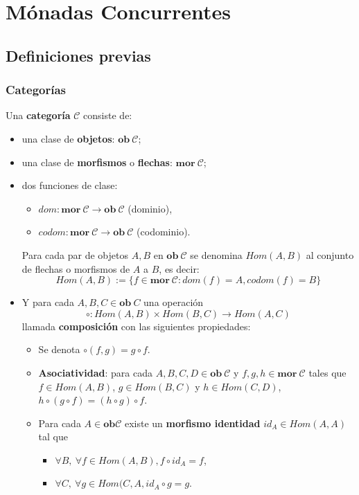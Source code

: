 \chapter{M\'onadas Concurrentes}\label{chapter:monconc}


\section{Definiciones previas}\label{monconc:previas}

\subsection{Categorías}\label{previas:cat}
Una \textbf{categoría} $\mathscr{C}$ consiste de:
\vspace{-0.75\baselineskip}
\begin{itemize}[noitemsep,label=$\blacktriangleright$]
	\item una clase de \textbf{objetos}: $\mathbf{ob} \ \mathscr{C}$;
	\item una clase de \textbf{morfismos} o \textbf{flechas}: $\mathbf{mor} \ \mathscr{C}$;
	\item dos funciones de clase:
	\begin{itemize}[noitemsep,label=$\bullet$]
		\item $dom : \mathbf{mor} \ \mathscr{C} \rightarrow \mathbf{ob} \ \mathscr{C}$ (dominio),
		\item $codom : \mathbf{mor} \ \mathscr{C} \rightarrow \mathbf{ob} \ \mathscr{C}$ (codominio).
	\end{itemize}
	Para cada par de objetos $A, B$ en $\mathbf{ob} \ \mathscr{C}$ se denomina $Hom(A,B)$ al conjunto de flechas o morfismos de $A$ a $B$, es decir:
	\begin{equation*}
		Hom(A,B) := \{f \in \mathbf{mor} \ \mathscr{C} : dom(f) = A, codom(f) = B\}
	\end{equation*}
	\item Y para cada $A, B, C \in \mathbf{ob} \ \mathit{C}$ una operación  
	\begin{equation*}
		\circ : Hom(A,B) \times Hom(B,C) \rightarrow Hom(A,C)
	\end{equation*}
	llamada \textbf{composición} con las siguientes propiedades: 
	\begin{itemize}[noitemsep,label=$\bullet$]
		\item Se denota $\circ(f,g) = g \circ f$.
		\item \textbf{Asociatividad}: para cada $A,B,C,D \in \mathbf{ob} \ \mathscr{C}$ y $f,g,h \in \mathbf{mor} \ \mathscr{C}$ tales que $f \in Hom(A,B)$, $g \in Hom(B,C)$ y $h \in Hom(C,D)$, \ \ $h \circ (g \circ f) = (h \circ g) \circ f$.
		\item Para cada $A \in \mathbf{ob} \mathscr{C}$ existe un \textbf{morfismo identidad} $id_A \in Hom(A,A)$ tal que
		\begin{itemize}[noitemsep,label=$\star$]
			\item $\forall B, \ \forall f \in Hom(A,B), f \circ id_A = f$,
			\item $\forall C, \ \forall g \in Hom(C,A, id_A \circ g = g$.
		\end{itemize}
	\end{itemize}
	

\end{itemize}

